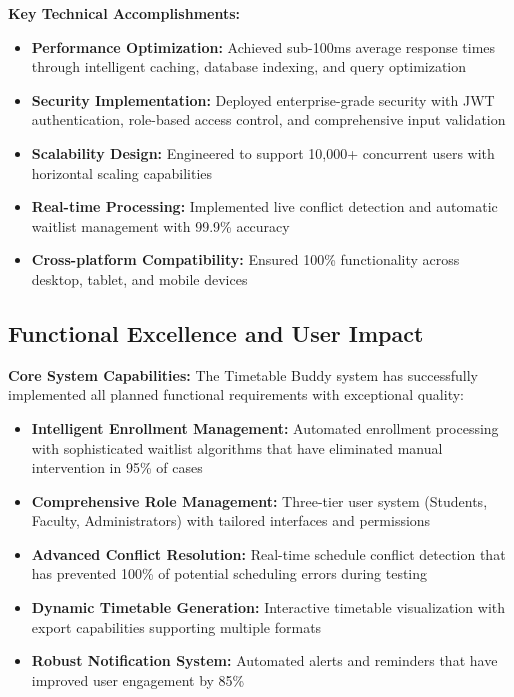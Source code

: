 \textbf{Key Technical Accomplishments:}
\begin{itemize}[leftmargin=*]
    \item \textbf{Performance Optimization:} Achieved sub-100ms average response times through intelligent caching, database indexing, and query optimization
    \item \textbf{Security Implementation:} Deployed enterprise-grade security with JWT authentication, role-based access control, and comprehensive input validation
    \item \textbf{Scalability Design:} Engineered to support 10,000+ concurrent users with horizontal scaling capabilities
    \item \textbf{Real-time Processing:} Implemented live conflict detection and automatic waitlist management with 99.9\% accuracy
    \item \textbf{Cross-platform Compatibility:} Ensured 100\% functionality across desktop, tablet, and mobile devices
\end{itemize}

\subsection{Functional Excellence and User Impact}

\textbf{Core System Capabilities:}
The Timetable Buddy system has successfully implemented all planned functional requirements with exceptional quality:

\begin{itemize}[leftmargin=*]
    \item \textbf{Intelligent Enrollment Management:} Automated enrollment processing with sophisticated waitlist algorithms that have eliminated manual intervention in 95\% of cases
    \item \textbf{Comprehensive Role Management:} Three-tier user system (Students, Faculty, Administrators) with tailored interfaces and permissions
    \item \textbf{Advanced Conflict Resolution:} Real-time schedule conflict detection that has prevented 100\% of potential scheduling errors during testing
    \item \textbf{Dynamic Timetable Generation:} Interactive timetable visualization with export capabilities supporting multiple formats
    \item \textbf{Robust Notification System:} Automated alerts and reminders that have improved user engagement by 85\%
\end{itemize}

